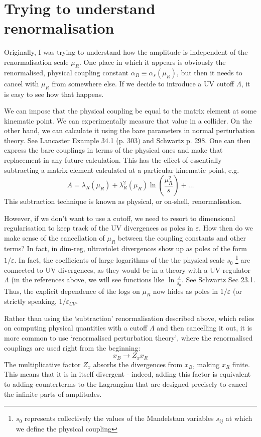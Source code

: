 \documentclass[main.tex]{subfiles}
\begin{document}
\section{Trying to understand renormalisation}
Originally, I was trying to understand how the amplitude is independent of the renormalisation scale $\mu_R$. One place in which it appears is obviously the renormalised, physical coupling constant $\alpha_R \equiv \alpha_s(\mu_R)$, but then it needs to cancel with $\mu_R$ from somewhere else. If we decide to introduce a UV cutoff $\Lambda$, it is easy to see how that happens.

We can impose that the physical coupling be equal to the matrix element at some kinematic point. We can experimentally measure that value in a collider. On the other hand, we can calculate it using the bare parameters in normal perturbation theory. See Lancaster Example 34.1 (p. 303) and Schwartz p. 298. One can then express the bare couplings in terms of the physical ones and make that replacement in any future calculation. This has the effect of essentially subtracting a matrix element calculated at a particular kinematic point, e.g.
\begin{equation}
    A = \lambda_R(\mu_R) + \lambda_R^2(\mu_R) \ln \left( \frac{\mu_R^2}{s} \right) + \ldots
\end{equation}
This subtraction technique is known as physical, or on-shell, renormalisation.

However, if we don't want to use a cutoff, we need to resort to dimensional regularisation to keep track of the UV divergences as poles in $\varepsilon$. How then do we make sense of the cancellation of $\mu_R$ between the coupling constants and other terms? In fact, in dim-reg, ultraviolet divergences show up as poles of
the form $1/\varepsilon$. In fact, the coefficients of large logarithms of the the physical scale $s_0$ \footnote{$s_0$ represents collectively the values of the Mandelstam variables $s_{ij}$ at which we define the physical coupling} are connected to UV divergences, as they would be in a theory with a UV regulator $\Lambda$ (in the references above, we will see functions like $\ln \frac{\Lambda}{s_0}$. See Schwartz Sec 23.1. Thus, the explicit dependence of the logs on $\mu_R$ now hides as poles in $1/\varepsilon$ (or strictly speaking, $1/\varepsilon_{UV}$.

Rather than using the `subtraction' renormalisation described above, which relies on computing physical quantities with a cutoff $\Lambda$ and then cancelling it out, it is more common to use `renormalised perturbation theory', where the renormalised couplings are used right from the beginning:
\begin{equation}
    x_B \rightarrow Z_x x_R
\end{equation}
The multiplicative factor $Z_x$ absorbs the divergences from $x_B$, making $x_R$ finite. This means that it is in itself divergent - indeed, adding this factor is equivalent to adding counterterms to the Lagrangian that are designed precisely to cancel the infinite parts of amplitudes.
\end{document}
